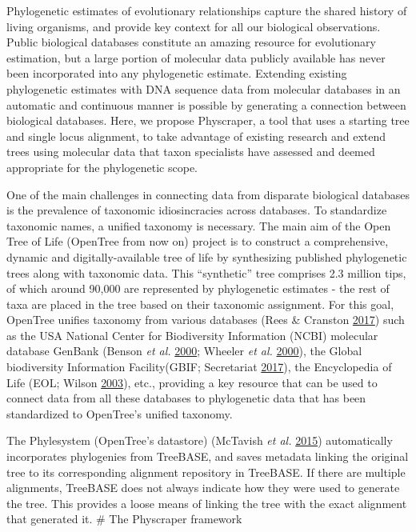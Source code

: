 \documentclass[]{article}
\begin{document}
Phylogenetic estimates of evolutionary relationships capture the shared history of living organisms, and provide key context for all our biological observations.
Public biological databases constitute an amazing resource for evolutionary estimation, but a large portion of molecular data publicly available has never been incorporated into any phylogenetic estimate. Extending existing phylogenetic estimates with DNA sequence data from molecular databases in an automatic and continuous manner is possible by generating a connection between biological databases. Here, we propose Physcraper, a tool that uses a starting tree and single locus alignment, to take advantage of existing research and extend trees using molecular data that taxon specialists have assessed and deemed appropriate for the phylogenetic scope.

One of the main challenges in connecting data from disparate biological databases is the prevalence of taxonomic idiosincracies across databases. To standardize taxonomic names, a unified taxonomy is necessary. The main aim of the Open Tree of Life (OpenTree from now on) project
is to construct a comprehensive, dynamic and digitally-available tree of life by synthesizing published phylogenetic trees along with taxonomic data. This ``synthetic'' tree comprises 2.3 million tips, of which around 90,000 are represented by phylogenetic estimates - the rest of taxa are placed in the tree based on their taxonomic assignment. For this goal, OpenTree unifies taxonomy from various databases (Rees \& Cranston \protect\hyperlink{ref-rees2017automated}{2017}) such as the USA National Center for Biodiversity Information (NCBI) molecular database GenBank (Benson \emph{et al.} \protect\hyperlink{ref-benson2000genbank}{2000}; Wheeler \emph{et al.} \protect\hyperlink{ref-wheeler2000database}{2000}), the Global biodiversity Information Facility(GBIF; Secretariat \protect\hyperlink{ref-secretariat2017gbif}{2017}), the Encyclopedia of Life (EOL; Wilson \protect\hyperlink{ref-wilson2003encyclopedia}{2003}), etc., providing a key resource that can be used to connect data from all these databases to phylogenetic data that has been standardized to OpenTree's unified taxonomy.

The Phylesystem (OpenTree's datastore) (McTavish \emph{et al.} \protect\hyperlink{ref-mctavish2015phylesystem}{2015}) automatically incorporates phylogenies from TreeBASE, and saves metadata linking the original tree to its corresponding alignment repository in TreeBASE. If there are multiple alignments, TreeBASE does not always indicate how they were used to generate the tree. This provides a loose means of linking the tree with the exact alignment that generated it.
\# The Physcraper framework
\end{document}
